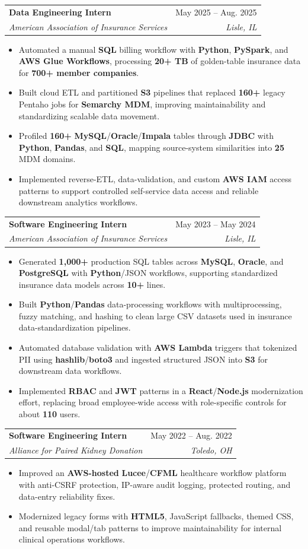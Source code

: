 \documentclass[letterpaper,11pt]{article}
\makeatletter
\newcommand{\resumeItem}[1]{
  \item\small{
    {#1 \vspace{-1pt}}
  }
}
\newcommand{\resumeSubheading}[4]{
  \vspace{-1pt}\item
    \begin{tabular*}{0.97\textwidth}[t]{l@{\extracolsep{\fill}}r}
      \textbf{#1} & #2 \\
      \textit{\small#3} & \textit{\small #4} \\
    \end{tabular*}\vspace{-3pt}
}
\newcommand{\resumeItemListStart}{\begin{itemize}[leftmargin=0.16in, itemsep=0pt, topsep=0pt, parsep=0pt]}
\newcommand{\resumeItemListEnd}{\end{itemize}\vspace{-4pt}}
\makeatother
\begin{document}
    \resumeSubheading
      {Data Engineering Intern}{May 2025 -- Aug. 2025}
      {American Association of Insurance Services}{Lisle, IL}
      \resumeItemListStart
        \resumeItem{Automated a manual \textbf{SQL} billing workflow with \textbf{Python}, \textbf{PySpark}, and \textbf{AWS Glue Workflows}, processing \textbf{20+ TB} of golden-table insurance data for \textbf{700+ member companies}.}
        \resumeItem{Built cloud ETL and partitioned \textbf{S3} pipelines that replaced \textbf{160+} legacy Pentaho jobs for \textbf{Semarchy MDM}, improving maintainability and standardizing scalable data movement.}
        \resumeItem{Profiled \textbf{160+} \textbf{MySQL}/\textbf{Oracle}/\textbf{Impala} tables through \textbf{JDBC} with \textbf{Python}, \textbf{Pandas}, and \textbf{SQL}, mapping source-system similarities into \textbf{25} MDM domains.}
        \resumeItem{Implemented reverse-ETL, data-validation, and custom \textbf{AWS IAM} access patterns to support controlled self-service data access and reliable downstream analytics workflows.}
      \resumeItemListEnd

    \resumeSubheading
      {Software Engineering Intern}{May 2023 -- May 2024}
      {American Association of Insurance Services}{Lisle, IL}
      \resumeItemListStart
        \resumeItem{Generated \textbf{1,000+} production SQL tables across \textbf{MySQL}, \textbf{Oracle}, and \textbf{PostgreSQL} with \textbf{Python}/JSON workflows, supporting standardized insurance data models across \textbf{10+} lines.}
        \resumeItem{Built \textbf{Python}/\textbf{Pandas} data-processing workflows with multiprocessing, fuzzy matching, and hashing to clean large CSV datasets used in insurance data-standardization pipelines.}
        \resumeItem{Automated database validation with \textbf{AWS Lambda} triggers that tokenized PII using \textbf{hashlib}/\textbf{boto3} and ingested structured JSON into \textbf{S3} for downstream data workflows.}
        \resumeItem{Implemented \textbf{RBAC} and \textbf{JWT} patterns in a \textbf{React}/\textbf{Node.js} modernization effort, replacing broad employee-wide access with role-specific controls for about \textbf{110} users.}
      \resumeItemListEnd

    \resumeSubheading
      {Software Engineering Intern}{May 2022 -- Aug. 2022}
      {Alliance for Paired Kidney Donation}{Toledo, OH}
      \resumeItemListStart
        \resumeItem{Improved an \textbf{AWS-hosted} \textbf{Lucee}/\textbf{CFML} healthcare workflow platform with anti-CSRF protection, IP-aware audit logging, protected routing, and data-entry reliability fixes.}
        \resumeItem{Modernized legacy forms with \textbf{HTML5}, JavaScript fallbacks, themed CSS, and reusable modal/tab patterns to improve maintainability for internal clinical operations workflows.}
      \resumeItemListEnd
\end{document}
